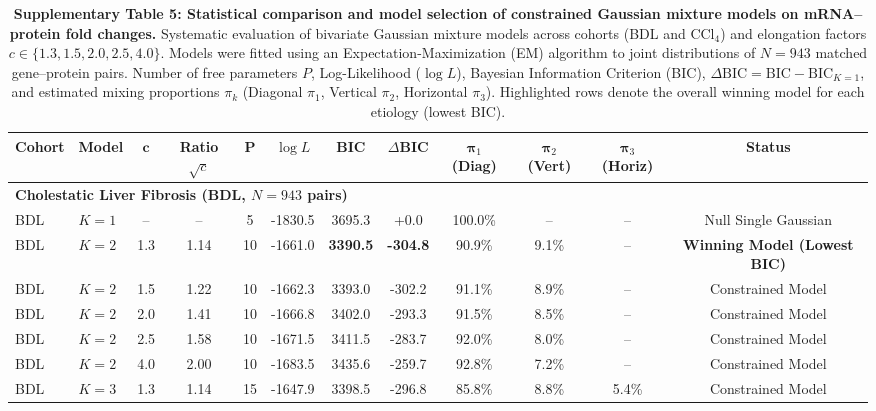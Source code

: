 \documentclass[10pt,a4paper,landscape]{article}
\begin{document}
\thispagestyle{empty}

\begin{table}[H]
\centering
\caption{\textbf{Supplementary Table 5: Statistical comparison and model selection of constrained Gaussian mixture models on mRNA--protein fold changes.} Systematic evaluation of bivariate Gaussian mixture models across cohorts (BDL and CCl$_4$) and elongation factors $c \in \{1.3, 1.5, 2.0, 2.5, 4.0\}$. Models were fitted using an Expectation-Maximization (EM) algorithm to joint distributions of $N = 943$ matched gene--protein pairs. Number of free parameters $P$, Log-Likelihood ($\log L$), Bayesian Information Criterion (BIC), $\Delta\text{BIC} = \text{BIC} - \text{BIC}_{K=1}$, and estimated mixing proportions $\pi_k$ (Diagonal $\pi_1$, Vertical $\pi_2$, Horizontal $\pi_3$). Highlighted rows denote the overall winning model for each etiology (lowest BIC).}
\label{tab:suppl_table_5}
\vspace{0.3cm}
\small
\setlength{\tabcolsep}{6pt}
\renewcommand{\arraystretch}{1.15}
\begin{tabular*}{\textwidth}{@{\extracolsep{\fill}} llcccccccccc}
\toprule
\textbf{Cohort} & \textbf{Model} & $\mathbf{c}$ & \textbf{Ratio} $\sqrt{c}$ & $\mathbf{P}$ & $\log L$ & \textbf{BIC} & $\Delta\mathbf{BIC}$ & $\boldsymbol{\pi}_1$ \textbf{(Diag)} & $\boldsymbol{\pi}_2$ \textbf{(Vert)} & $\boldsymbol{\pi}_3$ \textbf{(Horiz)} & \textbf{Status} \\
\midrule
\multicolumn{12}{l}{\textbf{Cholestatic Liver Fibrosis (BDL, $N = 943$ pairs)}} \\
BDL & $K=1$ & -- & -- & 5 & -1830.5 & 3695.3 & +0.0 & 100.0\% & -- & -- & Null Single Gaussian \\
\rowcolor{wincolor} BDL & $K=2$ & 1.3 & 1.14 & 10 & -1661.0 & \textbf{3390.5} & \textbf{-304.8} & 90.9\% & 9.1\% & -- & \textbf{Winning Model (Lowest BIC)} \\
BDL & $K=2$ & 1.5 & 1.22 & 10 & -1662.3 & 3393.0 & -302.2 & 91.1\% & 8.9\% & -- & Constrained Model \\
BDL & $K=2$ & 2.0 & 1.41 & 10 & -1666.8 & 3402.0 & -293.3 & 91.5\% & 8.5\% & -- & Constrained Model \\
BDL & $K=2$ & 2.5 & 1.58 & 10 & -1671.5 & 3411.5 & -283.7 & 92.0\% & 8.0\% & -- & Constrained Model \\
BDL & $K=2$ & 4.0 & 2.00 & 10 & -1683.5 & 3435.6 & -259.7 & 92.8\% & 7.2\% & -- & Constrained Model \\
BDL & $K=3$ & 1.3 & 1.14 & 15 & -1647.9 & 3398.5 & -296.8 & 85.8\% & 8.8\% & 5.4\% & Constrained Model \\

\end{tabular*}
\end{table}
\end{document}
